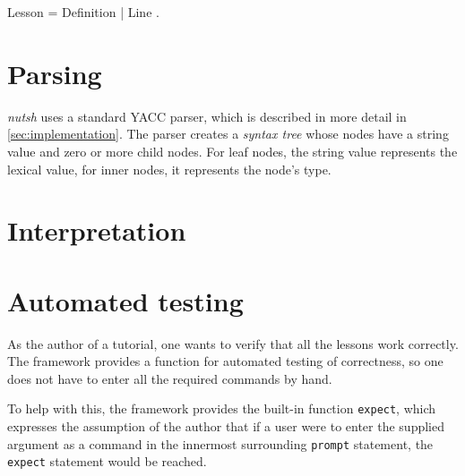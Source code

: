 \documentclass[paper=a4,twoside,abstract=on,cleardoublepage=empty,numbers=noenddot,toc=bib,12pt,appendixprefix=true]{scrreprt}
\begin{document}
\begin{ebnf}
Lesson = { Definition | Line } .
\end{ebnf}

\section{Parsing}

\emph{nutsh} uses a standard YACC parser, which is described in more detail in \cref{sec:implementation}. The parser creates a \emph{syntax tree} whose nodes have a string value and zero or more child nodes. For leaf nodes, the string value represents the lexical value, for inner nodes, it represents the node's type.


\section{Interpretation}


%
%
%
%
%

\section{Automated testing}


As the author of a tutorial, one wants to verify that all the lessons work correctly. The framework provides a function for automated testing of correctness, so one does not have to enter all the required commands by hand.

To help with this, the framework provides the built-in function \texttt{expect}, which expresses the assumption of the author that if a user were to enter the supplied argument as a command in the innermost surrounding \texttt{prompt} statement, the \texttt{expect} statement would be reached.
\end{document}
